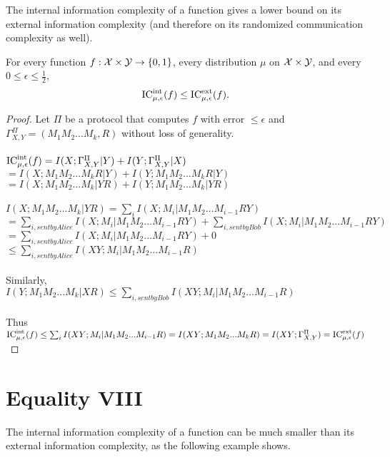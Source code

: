 The internal information complexity of a function gives a lower bound on its external information complexity (and therefore on its randomized communication complexity as well).

\begin{theorem}
	For every function $f : \mathcal{X} \times \mathcal{Y} \to \{0,1\}$, every distribution $\mu$ on $\mathcal{X} \times \mathcal{Y}$, and every $0 \le \epsilon \le \frac12$,
	\[
	\mathrm{IC}^{\mathrm{int}}_{\mu,\epsilon}(f) \le \mathrm{IC}^{\mathrm{ext}}_{\mu,\epsilon}(f).
	\]
\end{theorem}

\begin{proof}
	Let $\Pi$ be a protocol that computes $f$ with error $\leq \epsilon$ and $\Gamma_{X,Y}^\Pi = (M_1M_2...M_k,R)$ without loss of generality.\\
	\\
	$\mathrm{IC}^{\mathrm{int}}_{\mu,\epsilon}(f) = I(X;\Gamma_{X,Y}^\Pi|Y)+I(Y;\Gamma_{X,Y}^\Pi|X)$\\
	$=I(X;M_1M_2...M_kR|Y)+I(Y;M_1M_2...M_kR|Y)$\\
	$=I(X;M_1M_2...M_k|YR)+I(Y;M_1M_2...M_k|YR)$\\ 
	\\
	$I(X;M_1M_2...M_k|YR)=\sum_i I(X;M_i|M_1M_2...M_{i-1}RY)$\\
	$=\sum_{i,sent by Alice} I(X;M_i|M_1M_2...M_{i-1}RY)+\sum_{i,sent by Bob} I(X;M_i|M_1M_2...M_{i-1}RY)$\\
	$=\sum_{i,sent by Alice} I(X;M_i|M_1M_2...M_{i-1}RY)+0$\\
	$\leq \sum_{i,sent by Alice} I(XY;M_i|M_1M_2...M_{i-1}R)$\\
	\\
	Similarly, \\
	$I(Y;M_1M_2...M_k|XR) \leq \sum_{i,sent by Bob} I(XY;M_i|M_1M_2...M_{i-1}R)$\\
	\\
	Thus $\mathrm{IC}^{\mathrm{int}}_{\mu,\epsilon}(f) \leq \sum_i I(XY;M_i|M_1M_2...M_{i-1}R) = I(XY;M_1M_2...M_kR) = I(XY;\Gamma_{X,Y}^\Pi) = \mathrm{IC}^{\mathrm{ext}}_{\mu,\epsilon}(f)$
\end{proof}



\section{Equality VIII}

The internal information complexity of a function can be much smaller than its external information complexity, as the following example shows.


